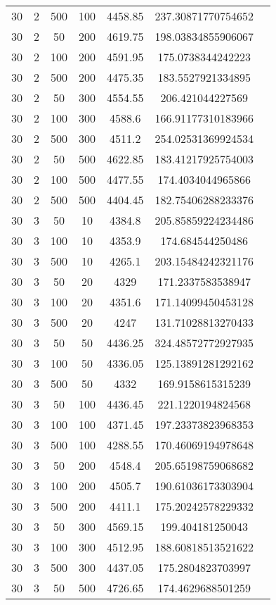 {\begin{longtabu}{S
S
S
S
S
S[round-mode=places,round-precision=0]
S[round-mode=places,round-precision=0]}
30 & 2 & 500 & 100 & 4458.85 & 237.30871770754652 \\
30 & 2 & 50 & 200 & 4619.75 & 198.03834855906067 \\
30 & 2 & 100 & 200 & 4591.95 & 175.0738344242223 \\
30 & 2 & 500 & 200 & 4475.35 & 183.5527921334895 \\
30 & 2 & 50 & 300 & 4554.55 & 206.421044227569 \\
30 & 2 & 100 & 300 & 4588.6 & 166.91177310183966 \\
30 & 2 & 500 & 300 & 4511.2 & 254.02531369924534 \\
30 & 2 & 50 & 500 & 4622.85 & 183.41217925754003 \\
30 & 2 & 100 & 500 & 4477.55 & 174.4034044965866 \\
30 & 2 & 500 & 500 & 4404.45 & 182.75406288233376 \\
30 & 3 & 50 & 10 & 4384.8 & 205.85859224234486 \\
30 & 3 & 100 & 10 & 4353.9 & 174.684544250486 \\
30 & 3 & 500 & 10 & 4265.1 & 203.15484242321176 \\
30 & 3 & 50 & 20 & 4329 & 171.2337583538947 \\
30 & 3 & 100 & 20 & 4351.6 & 171.14099450453128 \\
30 & 3 & 500 & 20 & 4247 & 131.71028813270433 \\
30 & 3 & 50 & 50 & 4436.25 & 324.48572772927935 \\
30 & 3 & 100 & 50 & 4336.05 & 125.13891281292162 \\
30 & 3 & 500 & 50 & 4332 & 169.9158615315239 \\
30 & 3 & 50 & 100 & 4436.45 & 221.1220194824568 \\
30 & 3 & 100 & 100 & 4371.45 & 197.23373823968353 \\
30 & 3 & 500 & 100 & 4288.55 & 170.46069194978648 \\
30 & 3 & 50 & 200 & 4548.4 & 205.65198759068682 \\
30 & 3 & 100 & 200 & 4505.7 & 190.61036173303904 \\
30 & 3 & 500 & 200 & 4411.1 & 175.20242578229332 \\
30 & 3 & 50 & 300 & 4569.15 & 199.404181250043 \\
30 & 3 & 100 & 300 & 4512.95 & 188.60818513521622 \\
30 & 3 & 500 & 300 & 4437.05 & 175.2804823703997 \\
30 & 3 & 50 & 500 & 4726.65 & 174.4629688501259 \\

\end{longtabu}}
